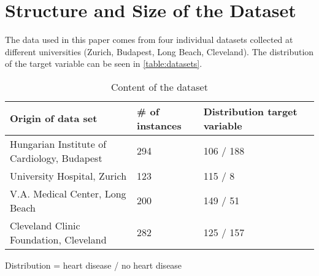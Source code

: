 \section{Structure and Size of the Dataset} \label{sec:dataUnderstanding}


The data used in this paper comes from four individual datasets collected at different universities (Zurich, Budapest, Long Beach, Cleveland). The distribution of the target variable can be seen in \vref{table:datasets}.
\begin{table}[h]

    \begin{footnotesize}
        \begin{tabular}{|l|l|l|l|}
            \hline
            \textbf{Origin of data set}              & \textbf{\# of instances} & \textbf{Distribution target variable} \\ \hline
            Hungarian Institute of Cardiology, Budapest & 294                      & 106 / 188                             \\ \hline
            University Hospital, Zurich                 & 123                      & 115 / 8                               \\ \hline
            V.A. Medical Center, Long Beach             & 200                      & 149 / 51                              \\ \hline
            Cleveland Clinic Foundation, Cleveland      & 282                      & 125 / 157                             \\ \hline
        \end{tabular}
    \end{footnotesize}
    \begin{center}
        \centering
        Distribution = heart disease / no heart disease
    \end{center}
    \caption{Content of the dataset}
    \label{table:datasets}
\end{table}



